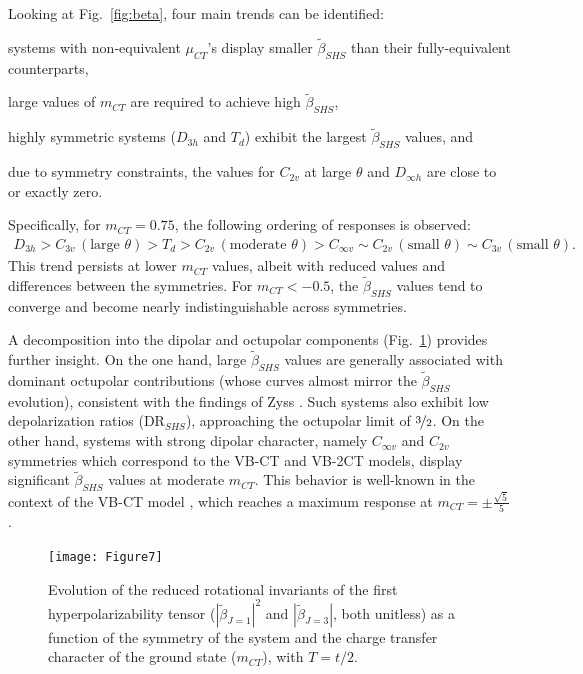 \documentclass[USenglish]{article}
\begin{document}
Looking at Fig.~\ref{fig:beta}, four main trends can be identified: \begin{inparaenum}[(i)]
	\item systems with non-equivalent $\mu_{CT}$'s display smaller $\tilde\beta_{SHS}$ than their fully-equivalent counterparts,
	\item large values of $m_{CT}$ are required to achieve high $\tilde\beta_{SHS}$,
	\item highly symmetric systems ($D_{3h}$ and $T_d$) exhibit the largest $\tilde\beta_{SHS}$ values, and
	\item due to symmetry constraints, the values for $C_{2v}$ at large $\theta$ and $D_{\infty h}$ are close to or exactly zero.
\end{inparaenum}
Specifically, for $m_{CT} = 0.75$, the following ordering of responses is observed:
\begin{align}
	D_{3h} > C_{3v}\,(\text{large } \theta) > T_d > C_{2v}\,(\text{moderate } \theta) > C_{\infty v} \sim C_{2v}\,(\text{small } \theta) \sim C_{3v}\,(\text{small } \theta). \label{eq:ordering}
\end{align}
This trend persists at lower $m_{CT}$ values, albeit with reduced values and differences between the symmetries. For $m_{CT} < -0.5$, the $\tilde\beta_{SHS}$ values tend to converge and become nearly indistinguishable across symmetries.

A decomposition into the dipolar and octupolar components (Fig.~\ref{fig:betaJ}) provides further insight. On the one hand, large $\tilde\beta_{SHS}$ values are generally associated with dominant octupolar contributions (whose curves almost mirror the $\tilde\beta_{SHS}$ evolution), consistent with the findings of Zyss \cite{zyssMolecularEngineeringImplications1993}. Such systems also exhibit low depolarization ratios (DR$_{SHS}$), approaching the octupolar limit of $\nicefrac{3}{2}$. On the other hand, systems with strong dipolar character, namely $C_{\infty v}$ and $C_{2v}$ symmetries which correspond to the VB-CT and VB-2CT models, display significant $\tilde\beta_{SHS}$ values at moderate $m_{CT}$. This behavior is well-known in the context of the VB-CT model \cite{barzoukasTwostateDescriptionHyper1996}, which reaches a maximum response at $m_{CT} = \pm\frac{\sqrt{5}}{5}$.

\begin{figure}[!h]
\texttt{[image: Figure7]}
\caption{Evolution of the reduced rotational invariants of the first hyperpolarizability tensor ($|\tilde \beta_{J=1}|^2$ and $|\tilde \beta_{J=3}|$, both unitless) as a function of the symmetry of the system and the charge transfer character of the ground state ($m_{CT}$), with $T=t/2$.}
\label{fig:betaJ}
\end{figure}
\end{document}
